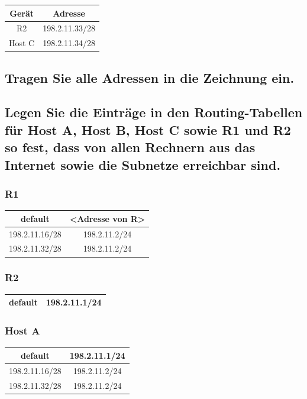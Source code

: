 \documentclass{article}
\begin{document}
\begin{tabular}{|c|c|}
	\hline
	Gerät  & Adresse        \\
	\hline
	R2     & 198.2.11.33/28 \\
	\hline
	Host C & 198.2.11.34/28 \\
	\hline
\end{tabular}

\subsection{Tragen Sie alle Adressen in die Zeichnung ein.}

\subsection{Legen Sie die Einträge in den Routing-Tabellen für Host A, Host B, Host C sowie R1 und R2 so
fest, dass von allen Rechnern aus das Internet sowie die Subnetze erreichbar sind.}

\vspace{1em}

\subsubsection*{R1}

\begin{tabular}{|c|c|}
	\hline
	default        & <Adresse von R> \\
	\hline
	198.2.11.16/28 & 198.2.11.2/24   \\
	\hline
	198.2.11.32/28 & 198.2.11.2/24   \\
	\hline
\end{tabular}

\subsubsection*{R2}

\begin{tabular}{|c|c|}
	\hline
	default        & 198.2.11.1/24 \\
	\hline
\end{tabular}

\subsubsection*{Host A}

\begin{tabular}{|c|c|}
	\hline
	default        & 198.2.11.1/24 \\
	\hline
	198.2.11.16/28 & 198.2.11.2/24 \\
	\hline
	198.2.11.32/28 & 198.2.11.2/24 \\
	\hline
\end{tabular}
\end{document}
